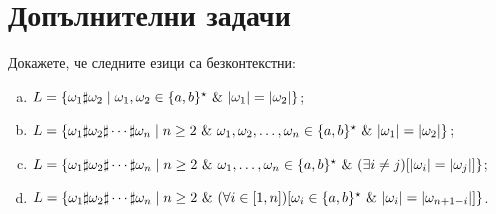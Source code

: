 \section{Допълнителни задачи}

\begin{problem}
  Докажете, че следните езици са безконтекстни:
  \begin{enumerate}[a)]
  \item 
    $L = \{\omega_1\sharp\omega_2 \mid \omega_1,\omega_2 \in \{a,b\}^\star\ \&\ \lvert{\omega_1}\rvert = \lvert{\omega_2}\rvert\}$;
  \item
    $L = \{\omega_1 \sharp \omega_2 \sharp \cdots \sharp \omega_n \mid n\geq 2\ \&\ \omega_1,\omega_2,\dots,\omega_n \in \{a,b\}^\star\ \&\ \abs{\omega_1} = \abs{\omega_2}\}$;
  \item
    $L = \{\omega_1 \sharp \omega_2 \sharp \cdots \sharp \omega_n \mid n\geq 2\ \&\ \omega_1,\dots,\omega_n \in \{a,b\}^\star\ \&\ (\exists i \neq j)[\lvert{\omega_i}\rvert = \lvert{\omega_j}\rvert]\}$;
  \item
    $L = \{\omega_1 \sharp \omega_2 \sharp \cdots \sharp \omega_n \mid n\geq 2\ \&\ (\forall i\in[1,n])[\omega_i \in \{a,b\}^\star\ \&\ \lvert{\omega_i}\rvert = \lvert{\omega_{n+1-i}}\rvert]\}$.
  \end{enumerate}
\end{problem}


